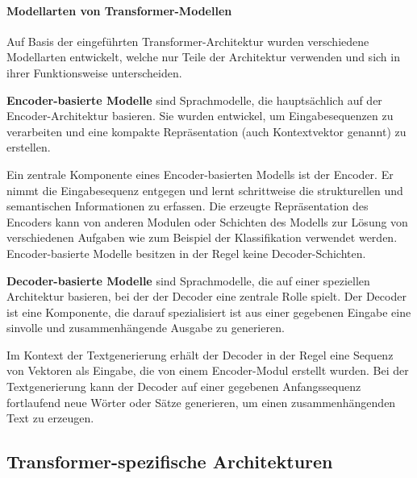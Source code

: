 \paragraph{Modellarten von Transformer-Modellen}
Auf Basis der eingeführten Transformer-Architektur wurden verschiedene Modellarten entwickelt, welche nur Teile der Architektur verwenden und sich in ihrer Funktionsweise unterscheiden.

\begin{definition}\label{def:encoder-basierte-modelle}
    \textbf{Encoder-basierte Modelle} sind Sprachmodelle, die hauptsächlich auf der Encoder-Architektur basieren.
    Sie wurden entwickel, um Eingabesequenzen zu verarbeiten und eine kompakte Repräsentation (auch Kontextvektor genannt) zu erstellen.
\end{definition}
Ein zentrale Komponente eines Encoder-basierten Modells ist der Encoder.
Er nimmt die Eingabesequenz entgegen und lernt schrittweise die strukturellen und semantischen Informationen zu erfassen.
Die erzeugte Repräsentation des Encoders kann von anderen Modulen oder Schichten des Modells zur Lösung von verschiedenen Aufgaben 
wie zum Beispiel der Klassifikation verwendet werden.
Encoder-basierte Modelle besitzen in der Regel keine Decoder-Schichten.\\

\begin{definition}\label{def:decoder-basierte-modelle}
    \textbf{Decoder-basierte Modelle} sind Sprachmodelle, die auf einer speziellen Architektur basieren, bei der der Decoder eine zentrale Rolle spielt.
    Der Decoder ist eine Komponente, die darauf spezialisiert ist aus einer gegebenen Eingabe eine sinvolle und zusammenhängende Ausgabe zu generieren.
\end{definition}
Im Kontext der Textgenerierung erhält der Decoder in der Regel eine Sequenz von Vektoren als Eingabe, die von einem Encoder-Modul erstellt wurden.
Bei der Textgenerierung kann der Decoder auf einer gegebenen Anfangssequenz fortlaufend neue Wörter oder Sätze generieren, um einen zusammenhängenden Text zu erzeugen.

\subsection{Transformer-spezifische Architekturen}

